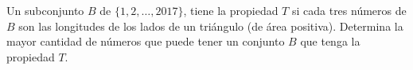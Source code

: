 Un subconjunto $B$ de $\{1, 2, \dots, 2017\}$, tiene la propiedad $T$ si cada tres números de $B$ son las longitudes de los lados de un triángulo (de área positiva).
Determina la mayor cantidad de números que puede tener un conjunto $B$ que tenga la
propiedad $T$.